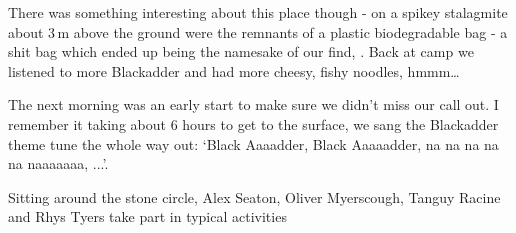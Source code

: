 There was something interesting about this place though - on a spikey stalagmite about 3\,m above the ground were the remnants of a plastic biodegradable bag - a shit bag which ended up being the namesake of our find, . Back at camp we listened to more Blackadder and had more cheesy, fishy noodles, hmmm…

The next morning was an early start to make sure we didn’t miss our call out. I remember it taking about 6 hours to get to the surface, we sang the Blackadder theme tune the whole way out: `Black Aaaadder, Black Aaaaadder, na na na na na naaaaaaa, ...'.


\begin{pagefigure}
\centering
{}
\caption{Sitting around the stone circle, Alex Seaton, Oliver Myerscough, Tanguy Racine and Rhys Tyers take part in typical  activities } \label{people in the bivi}
\end{pagefigure}

